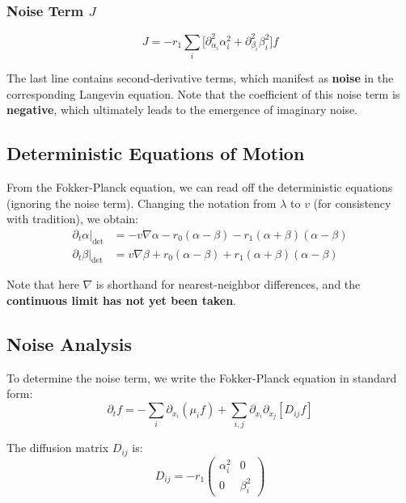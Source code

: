 \subsubsection{Noise Term $J$}

\begin{equation}\label{eq:noise-term}
\boxed{J = -r_1 \sum_i \Big[\partial_{\alpha_i}^2 \alpha_i^2 + \partial_{\beta_i}^2 \beta_i^2\Big]f}
\end{equation}

The last line contains second-derivative terms, which manifest as \textbf{noise} in the corresponding Langevin equation. Note that the coefficient of this noise term is \textbf{negative}, which ultimately leads to the emergence of imaginary noise.

\subsection{Deterministic Equations of Motion}\label{subsec:det-eom}

From the Fokker-Planck equation, we can read off the deterministic equations (ignoring the noise term). Changing the notation from $\lambda$ to $v$ (for consistency with tradition), we obtain:
\begin{align}
\partial_t \alpha\big|_{\text{det}} &= -v\nabla\alpha - r_0(\alpha - \beta) - r_1(\alpha + \beta)(\alpha - \beta) \label{eq:det-alpha}\\
\partial_t \beta\big|_{\text{det}} &= v\nabla\beta + r_0(\alpha - \beta) + r_1(\alpha + \beta)(\alpha - \beta) \label{eq:det-beta}
\end{align}

Note that here $\nabla$ is shorthand for nearest-neighbor differences, and the \textbf{continuous limit has not yet been taken}.

\subsection{Noise Analysis}\label{subsec:noise-analysis}

To determine the noise term, we write the Fokker-Planck equation in standard form:
\begin{equation}\label{eq:fpe-standard}
\partial_t f = -\sum_i \partial_{x_i}(\mu_i f) + \sum_{i,j} \partial_{x_i}\partial_{x_j}[D_{ij} f]
\end{equation}

The diffusion matrix $D_{ij}$ is:
\begin{equation}\label{eq:diffusion-matrix}
D_{ij} = -r_1 \begin{pmatrix} \alpha_i^2 & 0 \\ 0 & \beta_i^2 \end{pmatrix}
\end{equation}

